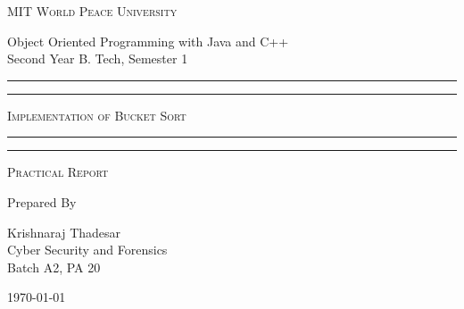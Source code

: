 \documentclass[11pt]{article}
\begin{document}
\begin{titlepage}
	\centering


	\huge\textsc{
		MIT World Peace University
	}\\

	\vspace{0.75\baselineskip} %

	\LARGE{
		Object Oriented Programming with Java and C++\\
		Second Year B. Tech, Semester 1
	}

	\vfill %


	\rule{\textwidth}{1.6pt}\vspace*{-\baselineskip}\vspace*{2pt}
	\rule{\textwidth}{0.6pt}
	\vspace{0.75\baselineskip} %



	\huge{\textsc{
			Implementation of Bucket Sort
		}} \\



	\vspace{0.5\baselineskip} %
	\rule{\textwidth}{0.6pt}\vspace*{-\baselineskip}\vspace*{2.8pt}
	\rule{\textwidth}{1.6pt}

	\vspace{1\baselineskip} %


	\LARGE\textsc{
		Practical Report
	} %
	\vfill


	Prepared By
	\vspace{0.5\baselineskip} %

	\Large{
		Krishnaraj Thadesar \\
		Cyber Security and Forensics\\
		Batch A2, PA 20
	}


	\vspace{0.5\baselineskip} %
	\today

\end{titlepage}
\end{document}

